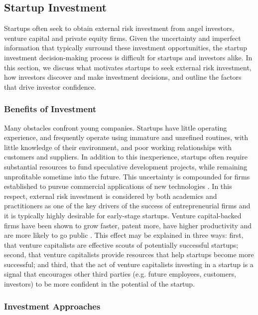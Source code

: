 \documentclass[../thesis/thesis.tex]{subfiles}
\begin{document}
\subsection{Startup Investment}

Startups often seek to obtain external risk investment from angel investors, venture capital and private equity firms. Given the uncertainty and imperfect information that typically surround these investment opportunities, the startup investment decision-making process is difficult for startups and investors alike. In this section, we discuss what motivates startups to seek external risk investment, how investors discover and make investment decisions, and outline the factors that drive investor confidence.

\subsubsection{Benefits of Investment}

Many obstacles confront young companies. Startups have little operating experience, and frequently operate using immature and unrefined routines, with little knowledge of their environment, and poor working relationships with customers and suppliers. In addition to this inexperience, startups often require substantial resources to fund speculative development projects, while remaining unprofitable sometime into the future. This uncertainty is compounded for firms established to pursue commercial applications of new technologies \cite{gans2003}. In this respect, external risk investment is considered by both academics and practitioners as one of the key drivers of the success of entrepreneurial firms and it is typically highly desirable for early-stage startups. Venture capital-backed firms have been shown to grow faster, patent more, have higher productivity and are more likely to go public \cite{wright1998}. This effect may be explained in three ways: first, that venture capitalists are effective scouts of potentially successful startups; second, that venture capitalists provide resources that help startups become more successful; and third, that the act of venture capitalists investing in a startup is a signal that encourages other third parties (e.g. future employees, customers, investors) to be more confident in the potential of the startup.

\subsubsection{Investment Approaches}
\end{document}
